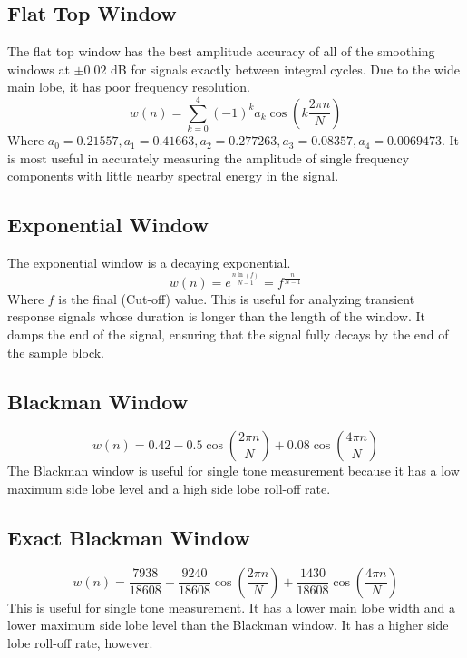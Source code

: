 \documentclass{article}
\theoremstyle{mystyle}
\begin{document}
\subsection{Flat Top Window}
\noindent The flat top window has the best amplitude accuracy of all of the smoothing windows at $\pm 0.02$ dB for signals exactly between integral cycles. Due to the wide main lobe, it has poor frequency resolution. 
\begin{equation}
w(n) = \sum_{k=0}^{4} (-1)^{k}a_{k}\cos(k\frac{2\pi n}{N})
\end{equation}
\noindent Where $a_{0} = 0.21557, a_{1} = 0.41663, a_{2} = 0.277263, a_{3} = 0.08357, a_{4} = 0.0069473$. It is most useful in accurately measuring the amplitude of single frequency components with little nearby spectral energy in the signal.
\subsection{Exponential Window}
The exponential window is a decaying exponential.
\begin{equation}
w(n) = e^{\frac{n\ln(f)}{N-1}} = f^{\frac{n}{N-1}}
\end{equation}
\noindent Where $f$ is the final (Cut-off) value. This is useful for analyzing transient response signals whose duration is longer than the length of the window. It damps the end of the signal, ensuring that the signal fully decays by the end of the sample block. 
\subsection{Blackman Window}
\begin{equation}
w(n) = 0.42 - 0.5\cos(\frac{2\pi n}{N}) + 0.08\cos(\frac{4 \pi n}{N})
\end{equation}
\noindent The Blackman window is useful for single tone measurement because it has a low maximum side lobe level and a high side lobe roll-off rate.
\subsection{Exact Blackman Window}
\begin{equation}
w(n) = \frac{7938}{18608} - \frac{9240}{18608}\cos(\frac{2\pi n}{N}) + \frac{1430}{18608}\cos(\frac{4\pi n}{N})
\end{equation}
\noindent This is useful for single tone measurement. It has a lower main lobe width and a lower maximum side lobe level than the Blackman window. It has a higher side lobe roll-off rate, however.
\end{document}
